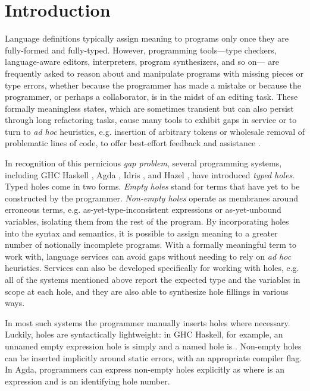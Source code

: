 \section{Introduction}
\label{sec:intro}

Language definitions typically assign meaning to programs only once they are fully-formed and fully-typed. 
However, programming tools---type checkers, language-aware editors, interpreters, program synthesizers, and so on---%
are frequently asked to reason about and manipulate programs with missing pieces or type errors,
whether because the programmer has made a mistake or because the programmer, or perhaps a collaborator, is in the midst of an editing task. 
These formally meaningless states, which are sometimes transient but can also persist through long refactoring tasks, cause many tools to exhibit gaps in service or to turn to  
\emph{ad hoc} heuristics, e.g. insertion of arbitrary tokens or wholesale removal of problematic lines of code, to offer best-effort feedback and assistance \cite{HazelnutSNAPL, DBLP:conf/oopsla/KatsJNV09}.

In recognition of this pernicious \emph{gap problem}, several programming systems, 
including GHC Haskell \cite{GHCHoles}, Agda \cite{norell:thesis}, Idris \cite{brady2013idris}, and Hazel \cite{DBLP:conf/popl/OmarVHAH17}, have introduced \emph{typed holes}. Typed holes come in two forms. \emph{Empty holes} 
stand for terms that have yet to be constructed by the programmer. 
\emph{Non-empty holes} 
operate as membranes around erroneous terms, e.g. as-yet-type-inconsistent
expressions or as-yet-unbound variables, 
isolating them from the rest of the program.
By incorporating holes into the syntax and semantics, 
it is possible to assign meaning to a greater number of notionally incomplete programs.
With a formally meaningful term to work with, language services can avoid gaps without needing to rely on \emph{ad hoc} heuristics.
Services can also be developed specifically for working with holes, e.g. all of the systems mentioned above report  
the expected type and the variables in scope at each hole, and they are also able to synthesize hole fillings in various ways.

In most such systems the programmer manually inserts holes where necessary.
Luckily, holes are syntactically lightweight: in GHC Haskell, for example, an unnamed empty expression
hole is simply \li{_} and a named hole is . 
Non-empty holes can be inserted implicitly around static errors, with an appropriate compiler flag. 
In Agda, programmers can express  
non-empty holes explicitly as  where  is an expression and  is an identifying hole number.

